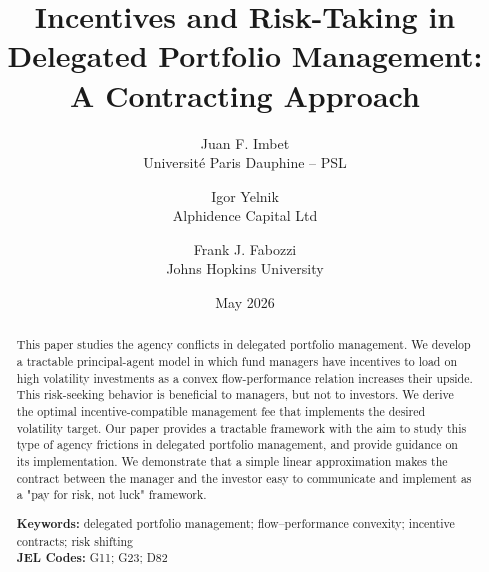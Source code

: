 \documentclass[11pt]{article}
\begin{document}
\begin{titlepage}
\title{\Large\bf Incentives and Risk-Taking in Delegated Portfolio Management: A Contracting Approach}
\author{\normalsize Juan F. Imbet\\ \normalsize Université Paris Dauphine -- PSL
\and
\normalsize Igor Yelnik\\ \normalsize Alphidence Capital Ltd
\and
\normalsize Frank J. Fabozzi\\ \normalsize Johns Hopkins University}
\date{May 2026}

\maketitle


\begin{abstract}
\noindent \small
This paper studies the agency conflicts in delegated portfolio management. We develop a tractable principal-agent model in which fund managers have incentives to load on high volatility investments as a convex flow-performance relation increases their upside. This risk-seeking behavior is beneficial to managers, but not to investors. We derive the optimal incentive-compatible management fee that implements the desired volatility target. Our paper provides a tractable framework with the aim to study this type of agency frictions in delegated portfolio management, and provide guidance on its implementation. We demonstrate that a simple linear approximation makes the contract between the manager and the investor easy to communicate and implement as a "pay for risk, not luck" framework.
\vspace{1cm}

\noindent\textbf{Keywords:} delegated portfolio management; flow–performance convexity; incentive contracts; risk shifting \\
\vspace{0in}
\noindent\textbf{JEL Codes:} G11; G23; D82

\bigskip
\end{abstract}

\setcounter{page}{0}
\thispagestyle{empty}
\end{titlepage}

\doublespacing
{}
\setlength{\parindent}{1cm}








\pagebreak


\pagebreak
{}


\normalsize

\clearpage
\appendix

\end{document}
